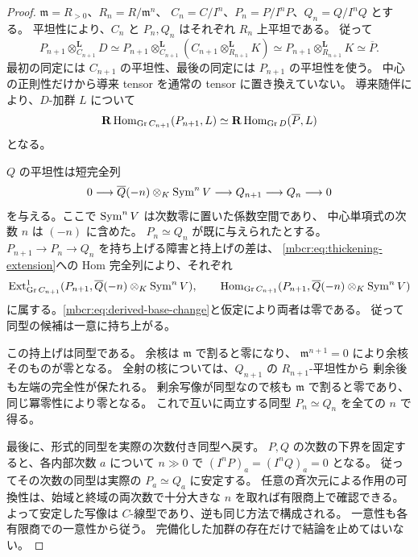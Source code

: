 \begin{proof}
$\mathfrak m=R_{>0}$、$R_n=R/\mathfrak m^n$、
$C_n=C/I^n$、$P_n=P/I^nP$、$Q_n=Q/I^nQ$ とする。
平坦性により、$C_n$ と $P_n,Q_n$ はそれぞれ $R_n$ 上平坦である。
従って
\begin{equation}\label{mbcr:eq:derived-base-change}
 P_{n+1}\otimes^{\mathbf L}_{C_{n+1}}D
 \simeq
 P_{n+1}\otimes^{\mathbf L}_{C_{n+1}}
       \left(C_{n+1}\otimes^{\mathbf L}_{R_{n+1}}K\right)
 \simeq P_{n+1}\otimes^{\mathbf L}_{R_{n+1}}K
 \simeq\overline P .
\end{equation}
最初の同定には $C_{n+1}$ の平坦性、最後の同定には
$P_{n+1}$ の平坦性を使う。
中心の正則性だけから導来 tensor を通常の tensor に置き換えていない。
導来随伴により、$D$-加群 $L$ について
\[
 \mathbf R\operatorname{Hom}_{\operatorname{Gr} C_{n+1}}(P_{n+1},L)
 \simeq\mathbf R\operatorname{Hom}_{\operatorname{Gr} D}(\overline P,L)
\]
となる。

$Q$ の平坦性は短完全列
\begin{equation}\label{mbcr:eq:thickening-extension}
 0\longrightarrow
 \overline Q(-n)\otimes_K\operatorname{Sym}^nV
 \longrightarrow Q_{n+1}\longrightarrow Q_n\longrightarrow0
\end{equation}
を与える。ここで $\operatorname{Sym}^nV$ は次数零に置いた係数空間であり、
中心単項式の次数 $n$ は $(-n)$ に含めた。
$P_n\simeq Q_n$ が既に与えられたとする。
$P_{n+1}\to P_n\to Q_n$ を持ち上げる障害と持上げの差は、
\eqref{mbcr:eq:thickening-extension}への Hom 完全列により、それぞれ
\[
 \operatorname{Ext}^1_{\operatorname{Gr} C_{n+1}}
  (P_{n+1},\overline Q(-n)\otimes_K\operatorname{Sym}^nV),\qquad
 \operatorname{Hom}_{\operatorname{Gr} C_{n+1}}
  (P_{n+1},\overline Q(-n)\otimes_K\operatorname{Sym}^nV)
\]
に属する。\eqref{mbcr:eq:derived-base-change}と仮定により両者は零である。
従って同型の候補は一意に持ち上がる。

この持上げは同型である。
余核は $\mathfrak m$ で割ると零になり、
$\mathfrak m^{n+1}=0$ により余核そのものが零となる。
全射の核については、$Q_{n+1}$ の $R_{n+1}$-平坦性から
剰余後も左端の完全性が保たれる。
剰余写像が同型なので核も $\mathfrak m$ で割ると零であり、
同じ冪零性により零となる。
これで互いに両立する同型 $P_n\simeq Q_n$ を全ての $n$ で得る。

最後に、形式的同型を実際の次数付き同型へ戻す。
$P,Q$ の次数の下界を固定すると、各内部次数 $a$ について
$n\gg0$ で $(I^nP)_a=(I^nQ)_a=0$ となる。
従ってその次数の同型は実際の $P_a\simeq Q_a$ に安定する。
任意の斉次元による作用の可換性は、始域と終域の両次数で十分大きな
$n$ を取れば有限商上で確認できる。
よって安定した写像は $C$-線型であり、逆も同じ方法で構成される。
一意性も各有限商での一意性から従う。
完備化した加群の存在だけで結論を止めてはいない。
\end{proof}

